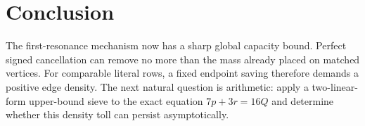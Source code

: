 \section{Conclusion}

The first-resonance mechanism now has a sharp global capacity bound.  Perfect signed
cancellation can remove no more than the mass already placed on matched vertices.  For
comparable literal rows, a fixed endpoint saving therefore demands a positive edge
density.  The next natural question is arithmetic: apply a two-linear-form upper-bound
sieve to the exact equation $7p+3r=16Q$ and determine whether this density toll can
persist asymptotically.
